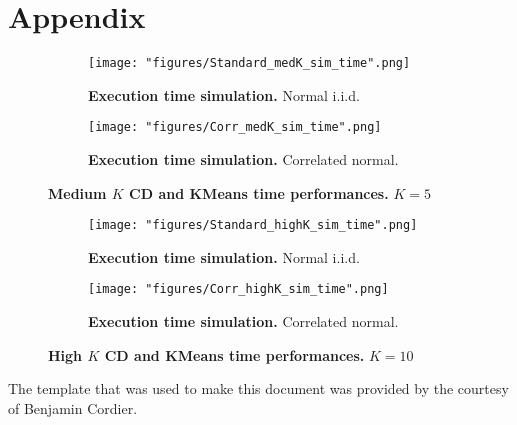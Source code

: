 \center

\section{Appendix}

\raggedright

\begin{figure}[h]
\begin{subfigure}[b]{0.49\linewidth}
\texttt{[image: "figures/Standard\_medK\_sim\_time".png]}
\caption{\textbf{Execution time simulation.} Normal i.i.d.}
\end{subfigure}
\hfill
\begin{subfigure}[b]{0.49\linewidth}
\texttt{[image: "figures/Corr\_medK\_sim\_time".png]}
\caption{\textbf{Execution time simulation.} Correlated normal.}
\end{subfigure}
\caption{\textbf{Medium $K$ \acrshort{CD} and KMeans time performances.} $K=5$}
\label{fig:medK_time_sim}
\end{figure}

\begin{figure}[h]
\begin{subfigure}[b]{0.49\linewidth}
\texttt{[image: "figures/Standard\_highK\_sim\_time".png]}
\caption{\textbf{Execution time simulation.} Normal i.i.d.}
\end{subfigure}
\hfill
\begin{subfigure}[b]{0.49\linewidth}
\texttt{[image: "figures/Corr\_highK\_sim\_time".png]}
\caption{\textbf{Execution time simulation.} Correlated normal.}
\end{subfigure}
\caption{\textbf{High $K$ \acrshort{CD} and KMeans time performances.} $K=10$}
\label{fig:highK_time_sim}
\end{figure}

The template that was used to make this document was provided by the courtesy of Benjamin Cordier\cite{OHSU-overleaf-dissertation-template}.